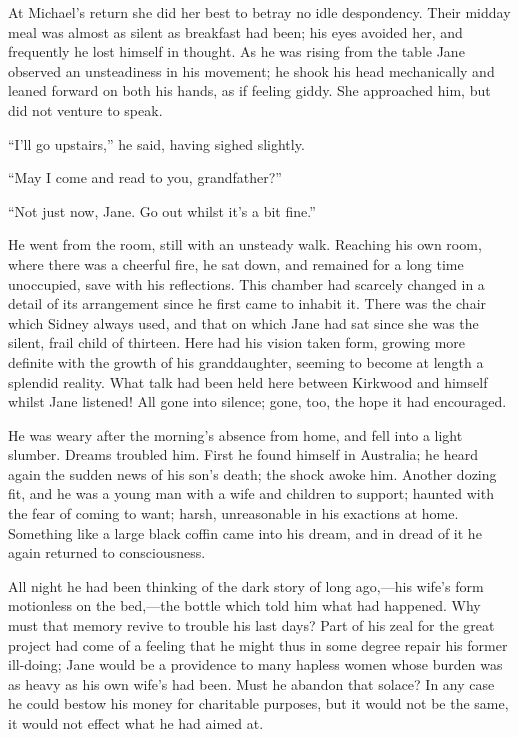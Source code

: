 {\protect\hypertarget{142}{}{}}At Michael's return she did her best to
betray no idle despondency. Their midday meal was almost as silent as
breakfast had been; his eyes avoided her, and frequently he lost himself
in thought. As he was rising from the table Jane observed an
unsteadiness in his movement; he shook his head mechanically and leaned
forward on both his hands, as if feeling giddy. She approached him, but
did not venture to speak.

``I'll go upstairs,'' he said, having sighed slightly.

``May I come and read to you, grandfather?''

``Not just now, Jane. Go out whilst it's a bit fine.''

He went from the room, still with an unsteady walk. Reaching his own
room, where there was a cheerful fire, he sat down, and remained for a
long time unoccupied, save with his reflections. This chamber had
scarcely changed in a detail of its arrangement since he first came to
inhabit it. There was the chair which Sidney always used, and that on
which Jane had sat since she was the silent, frail child of thirteen.
Here had his vision taken form, growing more definite with the growth of
his {\protect\hypertarget{143}{}{}}granddaughter, seeming to become at
length a splendid reality. What talk had been held here between Kirkwood
and himself whilst Jane listened! All gone into silence; gone, too, the
hope it had encouraged.

He was weary after the morning's absence from home, and fell into a
light slumber. Dreams troubled him. First he found himself in Australia;
he heard again the sudden news of his son's death; the shock awoke him.
Another dozing fit, and he was a young man with a wife and children to
support; haunted with the fear of coming to want; harsh, unreasonable in
his exactions at home. Something like a large black coffin came into his
dream, and in dread of it he again returned to consciousness.

All night he had been thinking of the dark story of long ago,---his
wife's form motionless on the bed,---the bottle which told him what had
happened. Why must that memory revive to trouble his last days? Part of
his zeal for the great project had come of a feeling that he might thus
in some degree repair his former ill-doing; Jane would be a providence
to many hapless women whose burden was as heavy as
{\protect\hypertarget{144}{}{}}his own wife's had been. Must he abandon
that solace? In any case he could bestow his money for charitable
purposes, but it would not be the same, it would not effect what he had
aimed at.

